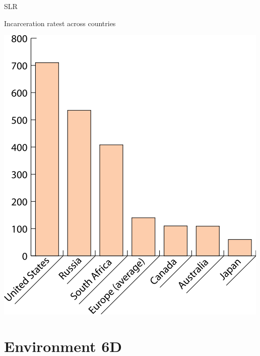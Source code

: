 \begin{chart}{S}{LR}
\caption{Incarceration ratest across countries}
\label{chart:incarceration}
\includegraphics[width=\chartwidth,height=\chartheight]{incarceration}  
\end{chart}


\section{Environment 6D}

\lipsum[1-4]

